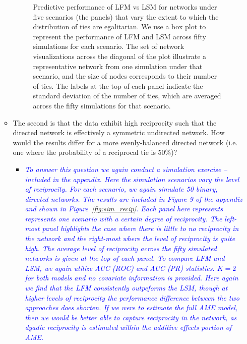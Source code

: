 \begin{enumerate}
\begin{itemize}
\begin{figure}[ht]
				\caption{Predictive performance of LFM vs LSM for networks under five scenarios (the panels) that vary the extent to which the distribution of ties are egalitarian. We use a box plot to represent the performance of LFM and LSM across fifty simulations for each scenario. The set of network visualizations across the diagonal of the plot illustrate a representative network from one simulation under that scenario, and the size of nodes corresponds to their number of ties. The labels at the top of each panel indicate the standard deviation of the number of ties, which are averaged across the fifty simulations for that scenario.}
				\label{fig:sim_egal}	
			\end{figure}			
		\item The second is that the data exhibit high reciprocity such that the directed network is effectively a symmetric undirected network. How would the results differ for a more evenly-balanced directed network (i.e. one where the probability of a reciprocal tie is 50\%)? 
			\begin{itemize}
				\item \textcolor{blue}{ \emph{
				To answer this question we again conduct a simulation exercise -- included in the appendix. Here the simulation scenarios vary the level of reciprocity. For each scenario, we again simulate 50 binary, directed networks. The results are included in Figure 9 of the appendix and shown in Figure~\ref{fig:sim_recip}. Each panel here represents represents one scenario with a certain degree of reciprocity. The left-most panel highlights the case where there is little to no reciprocity in the network and the right-most where the level of reciprocity is quite high. The average level of reciprocity across the fifty simulated networks is given at the top of each panel. To compare LFM and LSM, we again utilize AUC (ROC) and AUC (PR) statistics. $K=2$ for both models and no covariate information is provided. Here again we find that the LFM consistently outpeforms the LSM, though at higher levels of reciprocity the performance difference between the two approaches does shorten. If we were to estimate the full AME model, then we would be better able to capture reciprocity in the network, as dyadic reciprocity is estimated within the additive effects portion of AME.
				}}
			\end{itemize}	
			\begin{figure}[ht]
				\centering

\end{figure}
\end{itemize}
\end{enumerate}

